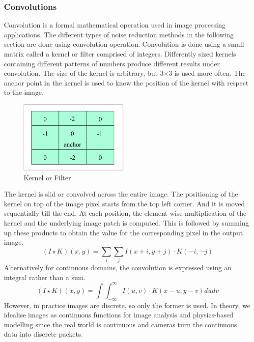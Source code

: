 \documentclass[10pt]{article}
\begin{document}
\begin{multicols}{2}
\subsubsection{Convolutions}
Convolution is a formal mathematical operation used in image processing applications. The different types of noise reduction methods in the following section are done using convolution operation.
\newline \newline
Convolution is done using a small matrix called a kernel or filter comprised of integers. Differently sized kernels containing different patterns of numbers produce different results under convolution. The size of the kernel is arbitrary, but 3×3 is used more often. The anchor point in the kernel is used to know the position of the kernel with respect to the image.
\begin{figure}[H]
    \centering
    \includegraphics[width=0.7\linewidth]{Images/Week 3/kernel.png}
    \caption{Kernel or Filter}
\end{figure}
The kernel is slid or convolved across the entire image. The positioning of the kernel on top of the image pixel starts from the top left corner. And it is moved sequentially till the end. At each position, the element-wise multiplication of the kernel and the underlying image patch is computed. This is followed by summing up these products to obtain the value for the corresponding pixel in the output image.
\[
(I\star K)(x,y)=\sum_i \sum_j I(x+i, y+j)\cdot K(-i, -j)
\]
Alternatively for continuous domains, the convolution is expressed using an integral rather than a sum.
\[
(I\star K)(x,y)=\int \int_{-\infty}^{\infty} I(u,v)\cdot K(x-u,y-v)dudv
\]
However, in practice images are discrete, so only the former is used. In theory, we idealise images as continuous functions for image analysis and physics-based modelling since the real world is continuous and cameras turn the continuous data into discrete packets.


\end{multicols}
\end{document}

